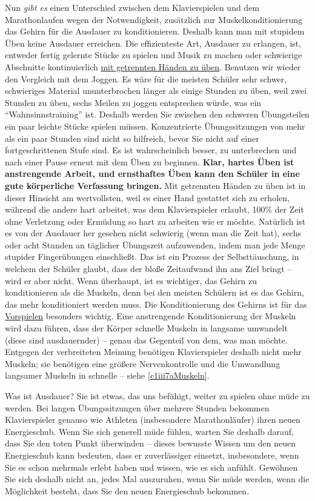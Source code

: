 Nun \textit{gibt es} einen Unterschied zwischen dem Klavierspielen und dem Marathonlaufen wegen der Notwendigkeit, zusätzlich zur Muskelkonditionierung das Gehirn für die Ausdauer zu konditionieren.
Deshalb kann man mit stupidem Üben keine Ausdauer erreichen.
Die effizienteste Art, Ausdauer zu erlangen, ist, entweder fertig gelernte Stücke zu spielen und Musik zu machen oder schwierige Abschnitte kontinuierlich \hyperref[c1ii7]{mit getrennten Händen zu üben}.
Benutzen wir wieder den Vergleich mit dem Joggen.
Es wäre für die meisten Schüler sehr schwer, schwieriges Material ununterbrochen länger als einige Stunden zu üben, weil zwei Stunden zu üben, sechs Meilen zu joggen entsprechen würde, was ein \enquote{Wahnsinnstraining} ist.
Deshalb werden Sie zwischen den schweren Übungsteilen ein paar leichte Stücke spielen müssen.
Konzentrierte Übungssitzungen von mehr als ein paar Stunden sind nicht so hilfreich, bevor Sie nicht auf einer fortgeschrittenen Stufe sind.
Es ist wahrscheinlich besser, zu unterbrechen und nach einer Pause erneut mit dem Üben zu beginnen.
\textbf{Klar, hartes Üben ist anstrengende Arbeit, und ernsthaftes Üben kann den Schüler in eine gute körperliche Verfassung bringen.}
Mit getrennten Händen zu üben ist in dieser Hinsicht am wertvollsten, weil es einer Hand gestattet sich zu erholen, während die andere hart arbeitet, was dem Klavierspieler erlaubt, 100\% der Zeit ohne Verletzung oder Ermüdung so hart zu arbeiten wie er möchte.
Natürlich ist es von der Ausdauer her gesehen nicht schwierig (wenn man die Zeit hat), sechs oder acht Stunden an täglicher Übungszeit aufzuwenden, indem man jede Menge stupider Fingerübungen einschließt.
Das ist ein Prozess der Selbsttäuschung, in welchem der Schüler glaubt, dass der bloße Zeitaufwand ihn ans Ziel bringt -- wird er aber nicht.
Wenn überhaupt, ist es wichtiger, das Gehirn zu konditionieren als die Muskeln, denn bei den meisten Schülern ist es das Gehirn, das mehr konditioniert werden muss.
Die Konditionierung des Gehirns ist für das \hyperref[c1iii14]{Vorspielen} besonders wichtig.
Eine anstrengende Konditionierung der Muskeln wird dazu führen, dass der Körper schnelle Muskeln in langsame umwandelt (diese sind ausdauernder) -- genau das Gegenteil von dem, was man möchte.
Entgegen der verbreiteten Meinung benötigen Klavierspieler deshalb nicht mehr Muskeln; sie benötigen eine größere Nervenkontrolle und die Umwandlung langsamer Muskeln in schnelle -- siehe \hyperref[c1iii7aMuskeln]{\autoref{c1iii7aMuskeln}}.

Was ist Ausdauer? Sie ist etwas, das uns befähigt, weiter zu spielen ohne müde zu werden.
Bei langen Übungssitzungen über mehrere Stunden bekommen Klavierspieler genauso wie Athleten (insbesondere Marathonläufer) ihren neuen Energieschub.
Wenn Sie sich generell müde fühlen, warten Sie deshalb darauf, dass Sie den toten Punkt überwinden -- dieses bewusste Wissen um den neuen Energieschub kann bedeuten, dass er zuverlässiger einsetzt, insbesondere, wenn Sie es schon mehrmals erlebt haben und wissen, wie es sich anfühlt.
Gewöhnen Sie sich deshalb nicht an, jedes Mal auszuruhen, wenn Sie müde werden, wenn die Möglichkeit besteht, dass Sie den neuen Energieschub bekommen.

